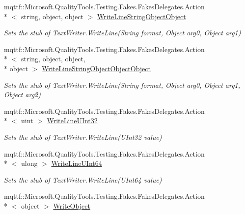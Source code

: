 \begin{DoxyCompactItemize}
mqttf\-::\-Microsoft.\-Quality\-Tools.\-Testing.\-Fakes.\-Fakes\-Delegates.\-Action\\*
$<$ string, object, object $>$ \hyperlink{class_system_1_1_i_o_1_1_fakes_1_1_stub_text_writer_a3a55c4d448ced63d24758f799b6235f7}{Write\-Line\-String\-Object\-Object}
\begin{DoxyCompactList}\small\item\em Sets the stub of Text\-Writer.\-Write\-Line(\-String format, Object arg0, Object arg1)\end{DoxyCompactList}\item 
mqttf\-::\-Microsoft.\-Quality\-Tools.\-Testing.\-Fakes.\-Fakes\-Delegates.\-Action\\*
$<$ string, object, object, \\*
object $>$ \hyperlink{class_system_1_1_i_o_1_1_fakes_1_1_stub_text_writer_a6f5f921f7702604bd7311f01eacd9443}{Write\-Line\-String\-Object\-Object\-Object}
\begin{DoxyCompactList}\small\item\em Sets the stub of Text\-Writer.\-Write\-Line(\-String format, Object arg0, Object arg1, Object arg2)\end{DoxyCompactList}\item 
mqttf\-::\-Microsoft.\-Quality\-Tools.\-Testing.\-Fakes.\-Fakes\-Delegates.\-Action\\*
$<$ uint $>$ \hyperlink{class_system_1_1_i_o_1_1_fakes_1_1_stub_text_writer_aee7abfa315acf0286fc9d79d3b674013}{Write\-Line\-U\-Int32}
\begin{DoxyCompactList}\small\item\em Sets the stub of Text\-Writer.\-Write\-Line(\-U\-Int32 value)\end{DoxyCompactList}\item 
mqttf\-::\-Microsoft.\-Quality\-Tools.\-Testing.\-Fakes.\-Fakes\-Delegates.\-Action\\*
$<$ ulong $>$ \hyperlink{class_system_1_1_i_o_1_1_fakes_1_1_stub_text_writer_a165479ee7486cc71e77779d88a2fa0de}{Write\-Line\-U\-Int64}
\begin{DoxyCompactList}\small\item\em Sets the stub of Text\-Writer.\-Write\-Line(\-U\-Int64 value)\end{DoxyCompactList}\item 
mqttf\-::\-Microsoft.\-Quality\-Tools.\-Testing.\-Fakes.\-Fakes\-Delegates.\-Action\\*
$<$ object $>$ \hyperlink{class_system_1_1_i_o_1_1_fakes_1_1_stub_text_writer_a5b85da0810286ff59162d2bd434c7d59}{Write\-Object}

\end{DoxyCompactItemize}
